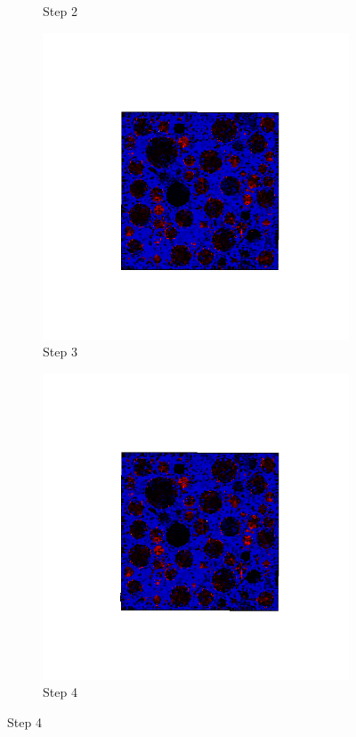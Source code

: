 \begin{figure}[ht!]
\begin{subfigure}{.25\textwidth}
      \caption{Step 2}
      \end{subfigure}%
      \begin{subfigure}{.25\textwidth}
        \centering
        \includegraphics[width=1.0\linewidth]{Files/A30P75_3_IS/DEP50-STEP(003).png}
      \caption{Step 3}
      \end{subfigure}%
      \begin{subfigure}{.25\textwidth}
        \centering
        \includegraphics[width=1.0\linewidth]{Files/A30P75_3_IS/DEP50-STEP(004).png}
      \caption{Step 4}
      \end{subfigure}


\end{figure}
